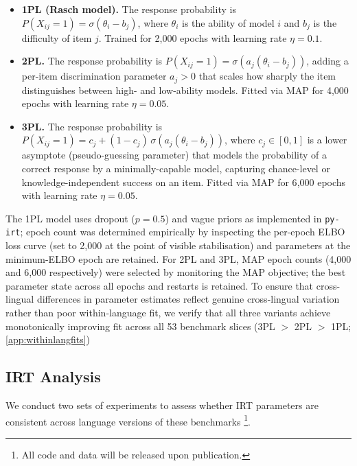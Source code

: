 \documentclass[11pt]{article}
\begin{document}
\begin{itemize}

  \item \textbf{1PL (Rasch model).}
  The response probability is
  $P(X_{ij}=1) = \sigma(\theta_i - b_j)$,
  where $\theta_i$ is the ability of model $i$ and $b_j$ is the difficulty of item $j$. Trained for 2{,}000 epochs with learning rate $\eta = 0.1$.

  \item \textbf{2PL.}
  The response probability is
  $P(X_{ij}=1) = \sigma\!\left(a_j(\theta_i - b_j)\right)$,
  adding a per-item discrimination parameter $a_j > 0$ that scales how sharply the
  item distinguishes between high- and low-ability models.
  Fitted via MAP for 4{,}000 epochs with learning rate $\eta = 0.05$.

  \item \textbf{3PL.}
  The response probability is
  $P(X_{ij}=1) = c_j + (1 - c_j)\,\sigma\!\left(a_j(\theta_i - b_j)\right)$,
  where $c_j \in [0,1]$ is a lower asymptote (pseudo-guessing parameter) that
  models the probability of a correct response by a minimally-capable model, capturing
  chance-level or knowledge-independent success on an item.
  Fitted via MAP for 6{,}000 epochs with learning rate $\eta = 0.05$.

\end{itemize}

\noindent
The 1PL model uses dropout ($p = 0.5$) and vague priors as implemented in \texttt{py-irt}; epoch count was determined empirically by inspecting the per-epoch ELBO loss curve (set to 2{,}000 at the point of visible stabilisation) and parameters at the minimum-ELBO epoch are retained. For 2PL and 3PL, MAP epoch counts (4{,}000 and 6{,}000 respectively) were selected by monitoring the MAP objective; the best parameter state across all epochs and restarts is retained. To ensure that cross-lingual differences in parameter estimates reflect genuine cross-lingual variation rather than poor within-language fit, we verify that all three variants achieve monotonically improving fit across all 53 benchmark slices (3PL $>$ 2PL $>$ 1PL; \autoref{app:withinlangfits})

\subsection{IRT Analysis}

We conduct two sets of experiments to assess whether IRT parameters are consistent across language versions of these benchmarks \footnote{All code and data will be released upon publication.}.
\end{document}
